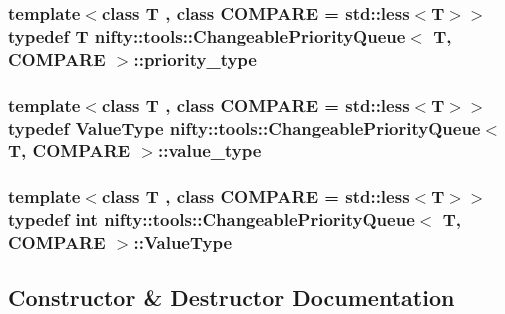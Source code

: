 \subsubsection[{priority\+\_\+type}]{\setlength{\rightskip}{0pt plus 5cm}template$<$class T , class C\+O\+M\+P\+A\+R\+E  = std\+::less$<$\+T$>$$>$ typedef T {\bf nifty\+::tools\+::\+Changeable\+Priority\+Queue}$<$ T, C\+O\+M\+P\+A\+R\+E $>$\+::{\bf priority\+\_\+type}}\label{classnifty_1_1tools_1_1ChangeablePriorityQueue_a6ecafb387f99a1cfa7ff5795c924682c}
\hypertarget{classnifty_1_1tools_1_1ChangeablePriorityQueue_aa00fbc748b94bdc6175b4c49bb2bba48}{}
\subsubsection[{value\+\_\+type}]{\setlength{\rightskip}{0pt plus 5cm}template$<$class T , class C\+O\+M\+P\+A\+R\+E  = std\+::less$<$\+T$>$$>$ typedef {\bf Value\+Type} {\bf nifty\+::tools\+::\+Changeable\+Priority\+Queue}$<$ T, C\+O\+M\+P\+A\+R\+E $>$\+::{\bf value\+\_\+type}}\label{classnifty_1_1tools_1_1ChangeablePriorityQueue_aa00fbc748b94bdc6175b4c49bb2bba48}
\hypertarget{classnifty_1_1tools_1_1ChangeablePriorityQueue_a3b9e96ad70a62b02b4a117d58f758a1f}{}
\subsubsection[{Value\+Type}]{\setlength{\rightskip}{0pt plus 5cm}template$<$class T , class C\+O\+M\+P\+A\+R\+E  = std\+::less$<$\+T$>$$>$ typedef int {\bf nifty\+::tools\+::\+Changeable\+Priority\+Queue}$<$ T, C\+O\+M\+P\+A\+R\+E $>$\+::{\bf Value\+Type}}\label{classnifty_1_1tools_1_1ChangeablePriorityQueue_a3b9e96ad70a62b02b4a117d58f758a1f}


\subsection{Constructor \& Destructor Documentation}
\hypertarget{classnifty_1_1tools_1_1ChangeablePriorityQueue_a5882abdd882fadd12ba20fd181b80c00}{}
